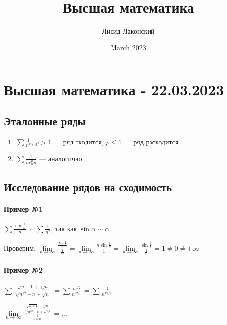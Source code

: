 \documentclass{article}
\title{Высшая математика}
\author{Лисид Лаконский}
\date{March 2023}
\begin{document}
\raggedright

\maketitle

\tableofcontents
\pagebreak

\section{Высшая математика - 22.03.2023}

\subsection{Эталонные ряды}

\begin{enumerate}
    \item $\sum \frac{1}{n^{p}}$, $p > 1$ — ряд сходится, $p \le 1$ — ряд расходится
    \item $\sum \frac{1}{n e_{n}^{p} n}$ — аналогично
\end{enumerate}

\subsection{Исследование рядов на сходимость}

\paragraph{Пример №1}

$\sum \frac{\sin \frac{1}{n}}{n} \sim \sum \frac{1}{n^2}$, так как $\sin \alpha \sim \alpha$

Проверим: $\lim\limits_{n \to \infty} \frac{\frac{\sin \frac{1}{n}}{n}}{\frac{1}{n^2}} = \lim\limits_{n \to \infty} \frac{n \sin \frac{1}{n}}{1} = \lim\limits_{n \to \infty} \frac{\sin \frac{1}{n}}{\frac{1}{n}} = 1 \ne 0 \ne \pm \infty$

\paragraph{Пример №2}

$\sum \frac{\sqrt{n + 1} + \sqrt[3]{n}}{\sqrt[5]{n^12 + n} + \sqrt{n^3}} = \sum \frac{n^{1/2}}{n^{12/5}}  = \sum \frac{1}{n^{19/10}}$

$\lim\limits_{n \to \infty} \frac{\frac{\sqrt{n + 1} + \sqrt[3]{n}}{\sqrt[5]{n^12 + n} + \sqrt{n^3}}}{\frac{1}{n^{19/10}}} = \dots$
\end{document}
